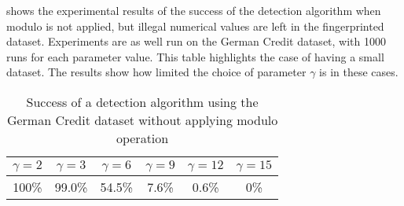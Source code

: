 \begin{table}[ht]
    \centering
    \caption{Bit difference and the detection fail rates for the German Credit data}
    \label{tab:detection-fail-rates}
\end{table}


 shows the experimental results of the success of the detection algorithm when modulo is not applied, but illegal numerical values are left in the fingerprinted dataset. 
Experiments are as well run on the German Credit dataset, with 1000 runs for each parameter value. 
This table highlights the case of having a small dataset. 
The results show how limited the choice of parameter $\gamma$ is in these cases. 

\begin{table}[ht]
    \centering
    \caption{Success of a detection algorithm using the German Credit dataset without applying modulo operation}
    \label{tab:detection-succ-german-without-modulo}
    \begin{tabular}{|c|c|c|c|c|c|}
    \hline
         $\gamma=2$ & $\gamma=3$ & $\gamma=6$ & $\gamma=9$ & $\gamma=12$ & $\gamma=15$\\
         \hline
         100\% & 99.0\% & 54.5\% & 7.6\% & 0.6\%  & 0\%\\
         \hline
    \end{tabular}
\end{table}

